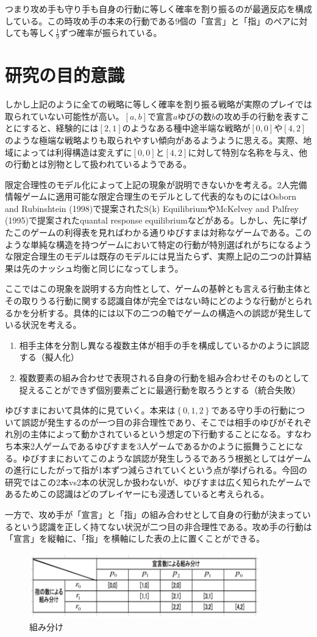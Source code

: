 \documentclass{jsarticle}
\begin{document}
つまり攻め手も守り手も自身の行動に等しく確率を割り振るのが最適反応を構成している。この時攻め手の本来の行動である$9$個の「宣言」と「指」のペアに対しても等しく$\frac{1}{9}$ずつ確率が振られている。

\section{研究の目的意識}
しかし上記のように全ての戦略に等しく確率を割り振る戦略が実際のプレイでは取られていない可能性が高い。$[a,b]$で宣言$a$ゆびの数$b$の攻め手の行動を表すことにすると、経験的には$[2,1]$のようなある種中途半端な戦略が$[0,0]$や$[4,2]$のような極端な戦略よりも取られやすい傾向があるようように思える。実際、地域によっては利得構造は変えずに$[0,0]$と$[4,2]$に対して特別な名称を与え、他の行動とは別物として扱われているようである。

限定合理性のモデル化によって上記の現象が説明できないかを考える。2人完備情報ゲームに適用可能な限定合理生のモデルとして代表的なものにはOsborn and Rubinshtein (1998)で提案されたS(k) EquilibriumやMcKelvey and Palfrey (1995)で提案されたquantal response equilibriumなどがある。しかし、先に挙げたこのゲームの利得表を見ればわかる通りゆびすまは対称なゲームである。このような単純な構造を持つゲームにおいて特定の行動が特別選ばれがちになるような限定合理生のモデルは既存のモデルには見当たらず、実際上記の二つの計算結果は先のナッシュ均衡と同じになってしまう。

ここではこの現象を説明する方向性として、ゲームの基幹とも言える行動主体とその取りうる行動に関する認識自体が完全ではない時にどのような行動がとられるかを分析する。具体的には以下の二つの軸でゲームの構造への誤認が発生している状況を考える。
\begin{enumerate}
	\item 相手主体を分割し異なる複数主体が相手の手を構成しているかのように誤認する（擬人化）
	\item 複数要素の組み合わせで表現される自身の行動を組み合わせそのものとして捉えることができず個別要素ごとに最適行動を取ろうとする（統合失敗）
\end{enumerate}

ゆびすまにおいて具体的に見ていく。本来は$\left\{ 0,1,2 \right\}$である守り手の行動について誤認が発生するのが一つ目の非合理性であり、そこでは相手のゆびがそれぞれ別の主体によって動かされているという想定の下行動することになる。すなわち本来2人ゲームであるゆびすまを3人ゲームであるかのように振舞うことになる。ゆびすまにおいてこのような誤認が発生しうるであろう根拠としてはゲームの進行にしたがって指が1本ずつ減らされていくという点が挙げられる。今回の研究ではこの2本vs2本の状況しか扱わないが、ゆびすまは広く知られたゲームであるためこの認識はどのプレイヤーにも浸透していると考えられる。

一方で、攻め手が「宣言」と「指」の組み合わせとして自身の行動が決まっているという認識を正しく持てない状況が二つ目の非合理性である。攻め手の行動は「宣言」を縦軸に、「指」を横軸にした表の上に置くことができる。
\begin{figure}[h]
    \centering
    \includegraphics[width=10cm]{class.png}
    \caption{組み分け}
\end{figure}
\end{document}
